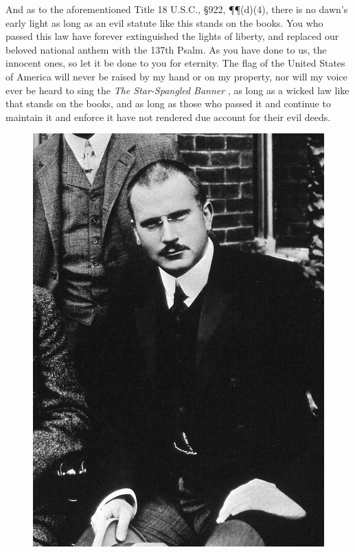 \documentclass[letterpaper]{article}
\begin{document}
And as to the aforementioned Title 18 U.S.C., \S922, \P\P(d)(4), there is no dawn's early light as long as an evil statute like this stands on the books.  You who passed this law have forever extinguished the lights of liberty, and replaced our beloved national anthem with the 137th Psalm.  As you have done to us, the innocent ones, so let it be done to you for eternity.  The flag of the United States of America will never be raised by my hand or on my property, nor will my voice ever be heard to sing the \textit{The Star-Spangled Banner} \cite{key1814star}, as long as a wicked law like that stands on the books, and as long as those who passed it and continue to maintain it and enforce it have not rendered due account for their evil deeds.
\begin{figure}
\noindent\begin{minipage}{0.45\textwidth}\centering
	\includegraphics[width=1.0\textwidth]{Carl-Jung-mod.jpg}

\end{minipage}
\end{figure}
\end{document}

